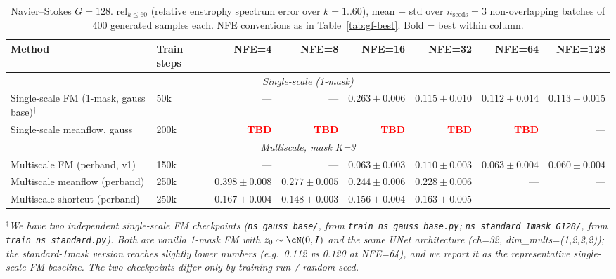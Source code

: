 \documentclass[11pt]{article}
\newcommand{\TBD}{\textcolor{red}{\textbf{TBD}}}
\newcommand{\meanrel}{\overline{\text{rel}}}
\begin{document}
\begin{table}[ht]
\centering
\small
\caption{Navier–Stokes $G=128$. $\meanrel_{k\leq 60}$ (relative enstrophy spectrum error over $k=1..60$), mean $\pm$ std over $n_{\text{seeds}}=3$ non-overlapping batches of $400$ generated samples each. NFE conventions as in Table~\ref{tab:gf-best}. Bold = best within column.}
\label{tab:ns-best}
\begin{tabular}{@{}llrrrrrr@{}}
\toprule
Method & Train steps & NFE=4 & NFE=8 & NFE=16 & NFE=32 & NFE=64 & NFE=128 \\
\midrule
\multicolumn{8}{c}{\textit{Single-scale (1-mask)}} \\
\midrule
Single-scale FM (1-mask, gauss base)$^{\dagger}$ & 50k & --- & --- & $0.263\pm 0.006$ & $0.115\pm 0.010$ & $0.112\pm 0.014$ & $0.113\pm 0.015$ \\
Single-scale meanflow, gauss & 200k & \TBD & \TBD & \TBD & \TBD & \TBD & --- \\
\midrule
\multicolumn{8}{c}{\textit{Multiscale, mask K=3}} \\
\midrule
Multiscale FM (perband, v1) & 150k & --- & --- & $\mathbf{0.063 \pm 0.003}$ & $0.110\pm 0.003$ & $\mathbf{0.063 \pm 0.004}$ & $\mathbf{0.060\pm 0.004}$ \\
Multiscale meanflow (perband) & 250k & $0.398\pm 0.008$ & $0.277\pm 0.005$ & $0.244\pm 0.006$ & $0.228\pm 0.006$ & --- & --- \\
Multiscale shortcut (perband) & 250k & $\mathbf{0.167\pm 0.004}$ & $\mathbf{0.148\pm 0.003}$ & $0.156\pm 0.004$ & $\mathbf{0.163\pm 0.005}$ & --- & --- \\
\bottomrule
\end{tabular}
\end{table}

\noindent$^{\dagger}$\emph{We have two independent single-scale FM checkpoints (\texttt{ns\_gauss\_base/}, from \texttt{train\_ns\_gauss\_base.py}; \texttt{ns\_standard\_1mask\_G128/}, from \texttt{train\_ns\_standard.py}). Both are vanilla 1-mask FM with $z_0\sim\cN(0,I)$ and the same UNet architecture (ch=32, dim\_mults=(1,2,2,2)); the standard-1mask version reaches slightly lower numbers (e.g.\ 0.112 vs 0.120 at NFE=64), and we report it as the representative single-scale FM baseline. The two checkpoints differ only by training run / random seed.}
\end{document}
